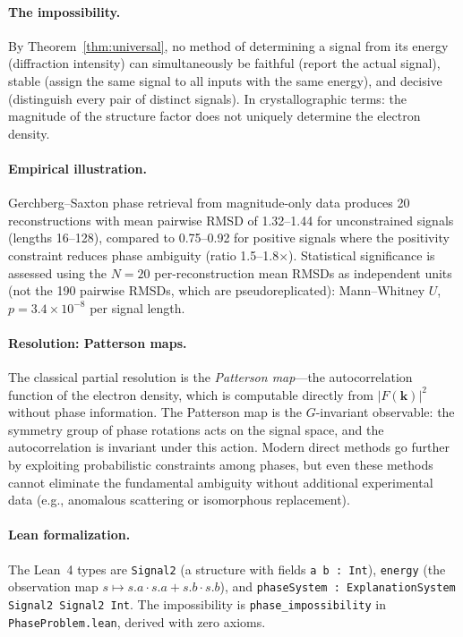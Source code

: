\paragraph{The impossibility.}
By Theorem~\ref{thm:universal}, no method of determining a signal from its
energy (diffraction intensity) can simultaneously be faithful (report the
actual signal), stable (assign the same signal to all inputs with the same
energy), and decisive (distinguish every pair of distinct signals).
In crystallographic terms: the magnitude of the structure factor does not
uniquely determine the electron density.

\paragraph{Empirical illustration.}
Gerchberg--Saxton phase retrieval from magnitude-only data produces 20
reconstructions with mean pairwise RMSD of 1.32--1.44 for unconstrained signals
(lengths 16--128), compared to 0.75--0.92 for positive signals where the
positivity constraint reduces phase ambiguity (ratio 1.5--1.8$\times$).
Statistical significance is assessed using the $N = 20$ per-reconstruction
mean RMSDs as independent units (not the 190 pairwise RMSDs, which are
pseudoreplicated): Mann--Whitney $U$, $p = 3.4 \times 10^{-8}$ per signal
length.

\paragraph{Resolution: Patterson maps.}
The classical partial resolution is the \emph{Patterson map}---the
autocorrelation function of the electron density, which is computable
directly from $|F(\mathbf{k})|^2$ without phase information.  The Patterson
map is the $G$-invariant observable: the symmetry group of phase rotations
acts on the signal space, and the autocorrelation is invariant under this
action.  Modern direct methods \citep{hauptman1953solution,karle1956structure} go further by exploiting
probabilistic constraints among phases, but even these methods cannot
eliminate the fundamental ambiguity without additional experimental data
(e.g., anomalous scattering or isomorphous replacement).

\paragraph{Lean formalization.}
The Lean~4 types are \texttt{Signal2} (a structure with fields
\texttt{a b : Int}), \texttt{energy} (the observation map
$s \mapsto s.a \cdot s.a + s.b \cdot s.b$), and
\texttt{phaseSystem : ExplanationSystem Signal2 Signal2 Int}.
The impossibility is \texttt{phase\_impossibility} in
\texttt{PhaseProblem.lean}, derived with zero axioms.
